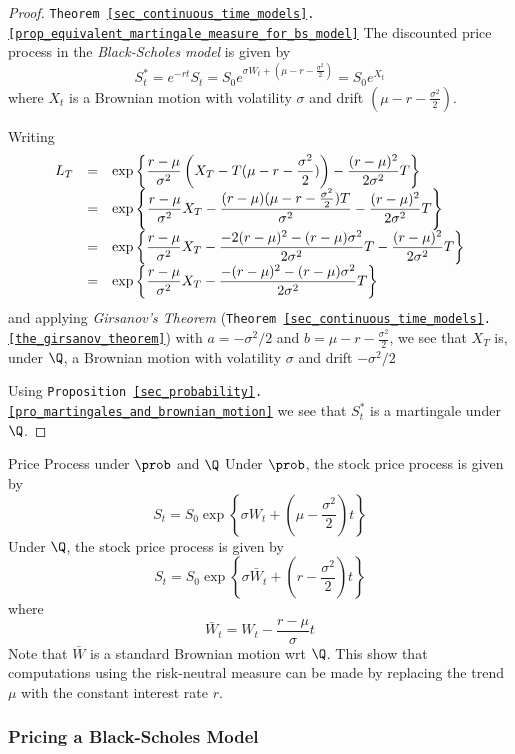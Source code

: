 \documentclass[11pt,a4paper]{article}
\begin{document}
  \begin{proof}{\texttt{Theorem \ref{sec_continuous_time_models}.\ref{prop_equivalent_martingale_measure_for_bs_model}}}
    The discounted price process in the \textit{Black-Scholes model} is given by
    \[ S_t^*=e^{-rt}S_t=S_0e^{\sigma W_t+\left(\mu-r-\frac{\sigma^2}2\right)}=S_0e^{X_t} \]
    where $X_t$ is a Brownian motion with volatility $\sigma$ and drift $\left(\mu-r-\frac{\sigma^2}2\right)$.
    \par Writing
    \[\everymath={\displaystyle}\begin{array}{rcl}
      L_T&=&\exp\left\{\frac{r-\mu}{\sigma^2}\left(X_T-T(\mu-r-\frac{\sigma^2}2)\right)-\frac{(r-\mu)^2}{2\sigma^2}T\right\}\\
      &=&\exp\left\{\frac{r-\mu}{\sigma^2}X_T-\frac{(r-\mu)(\mu-r-\frac{\sigma^2}2)T}{\sigma^2}-\frac{(r-\mu)^2}{2\sigma^2}T\right\}\\
      &=&\exp\left\{\frac{r-\mu}{\sigma^2}X_T-\frac{-2(r-\mu)^2-(r-\mu)\sigma^2}{2\sigma^2}T-\frac{(r-\mu)^2}{2\sigma^2}T\right\}\\
      &=&\exp\left\{\frac{r-\mu}{\sigma^2}X_T-\frac{-(r-\mu)^2-(r-\mu)\sigma^2}{2\sigma^2}T\right\}
    \end{array}\]
    and applying \textit{Girsanov's Theorem} (\texttt{Theorem \ref{sec_continuous_time_models}.\ref{the_girsanov_theorem}}) with $a=-\sigma^2/2$ and $b=\mu-r-\frac{\sigma^2}2$, we see that $X_T$ is, under $\Q$, a Brownian motion with volatility $\sigma$ and drift $-\sigma^2/2$
    \par Using \texttt{Proposition \ref{sec_probability}.\ref{pro_martingales_and_brownian_motion}} we see that $S_t^*$ is a martingale under $\Q$. \proved
  \end{proof}

  \begin{remark}{Price Process under $\prob$ and $\Q$}
    Under $\prob$, the stock price process is given by
    \[ S_t=S_0\exp\left\{\sigma W_t+(\mu-\frac{\sigma^2}2)t\right\} \]
    Under $\Q$, the stock price process is given by
    \[ S_t=S_0\exp\left\{\sigma\bar{W}_t+(r-\frac{\sigma^2}2)t\right\} \]
    where
    \[ \bar{W}_t=W_t-\frac{r-\mu}\sigma t \]
    Note that $\bar{W}$ is a standard Brownian motion wrt $\Q$. This show that computations using the risk-neutral measure can be made by replacing the trend $\mu$ with the constant interest rate $r$.
  \end{remark}

\subsubsection{Pricing a Black-Scholes Model}
\end{document}
